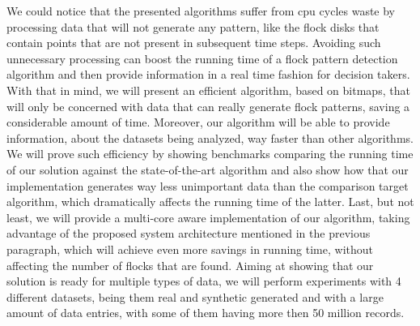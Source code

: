We could notice that the presented algorithms suffer from \ac{cpu} cycles waste by processing data that will not
generate any pattern, like the flock disks that contain points that are not present in subsequent time steps. Avoiding
such unnecessary processing can boost the running time of a flock pattern detection algorithm and then provide
information in a real time fashion for decision takers. With that in mind, we will present an efficient algorithm, based
on bitmaps, that will only be concerned with data that can really generate flock patterns, saving a considerable amount
of time. Moreover, our algorithm will be able to provide information, about the datasets being analyzed, way faster than
other algorithms. We will prove such efficiency by showing benchmarks comparing the running time of our solution against
the state-of-the-art algorithm and also show how that our implementation generates way less unimportant data than the
comparison target algorithm, which dramatically affects the running time of the latter. Last, but not least, we will
provide a multi-core aware implementation of our algorithm, taking advantage of the proposed system architecture
mentioned in the previous paragraph, which will achieve even more savings in running time, without affecting the number
of flocks that are found.  Aiming at showing that our solution is ready for multiple types of data, we will perform
experiments with 4 different datasets, being them real and synthetic generated and with a large amount of data entries,
with some of them having more then 50 million records.
